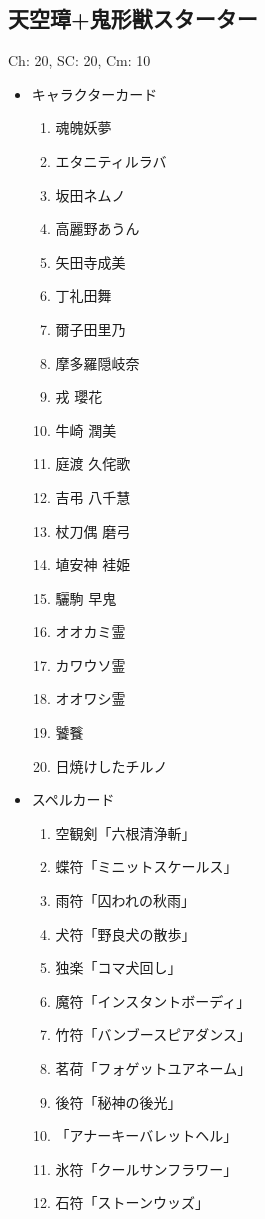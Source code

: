 \documentclass[line_length=22zw,number_of_lines=45,twocolumn]{jlreq}
\begin{document}
\subsection{天空璋+鬼形獣スターター}
Ch: 20, SC: 20, Cm: 10
\begin{itemize}
	\item キャラクターカード
		\begin{enumerate}
			\item 魂魄妖夢
			\item エタニティルラバ
			\item 坂田ネムノ
			\item 高麗野あうん
			\item 矢田寺成美
			\item 丁礼田舞
			\item 爾子田里乃
			\item 摩多羅隠岐奈
			\item 戎 瓔花
			\item 牛崎 潤美
			\item 庭渡 久侘歌
			\item 吉弔 八千慧
			\item 杖刀偶 磨弓
			\item 埴安神 袿姫
			\item 驪駒 早鬼
			\item オオカミ霊
			\item カワウソ霊
			\item オオワシ霊
			\item 饕餮
			\item 日焼けしたチルノ
		\end{enumerate}
	\item スペルカード
		\begin{enumerate}
			\item 空観剣「六根清浄斬」
			\item 蝶符「ミニットスケールス」
			\item 雨符「囚われの秋雨」
			\item 犬符「野良犬の散歩」
			\item 独楽「コマ犬回し」
			\item 魔符「インスタントボーディ」
			\item 竹符「バンブースピアダンス」
			\item 茗荷「フォゲットユアネーム」
			\item 後符「秘神の後光」
			\item 「アナーキーバレットヘル」
			\item 氷符「クールサンフラワー」
			\item 石符「ストーンウッズ」

\end{enumerate}
\end{itemize}
\end{document}
